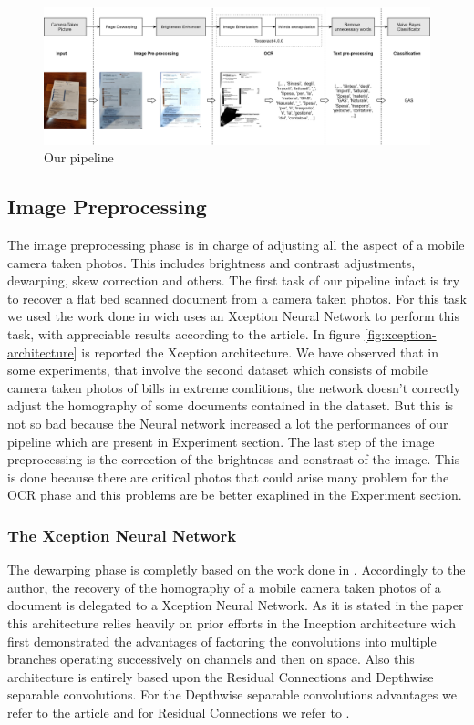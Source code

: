 \documentclass[10pt,twocolumn,letterpaper]{article}
\begin{document}
\begin{figure}[h]
  \centering
  \includegraphics[width=1.0\textwidth]{images/pipeline.png}
  \caption{Our pipeline}
  \label{fig:pipeline}
\end{figure}

\subsection{Image Preprocessing}

The image preprocessing phase is in charge of adjusting all the aspect
of a mobile camera taken photos. This includes brightness and contrast
adjustments, dewarping, skew correction and others. The first task of
our pipeline infact is try to recover a flat bed scanned document from
a camera taken photos. For this task we used the work done in
\cite{Korber18} wich uses an Xception Neural Network
\cite{Xception} to perform this task, with appreciable results
according to the article. In figure \ref{fig:xception-architecture} is
reported the Xception architecture.
We have observed that in some experiments, that involve the second dataset which consists of mobile camera taken photos of bills in extreme conditions,
the network doesn't correctly adjust the homography of some documents
contained in the dataset. But this is not so bad because the Neural network increased a lot the performances of our pipeline which are present in Experiment section. The last step of the image preprocessing is
the correction of the brightness and constrast of the image. This is
done because there are critical photos that could arise many problem
for the OCR phase and this problems are be better exaplined in the
Experiment section.

\subsubsection{The Xception Neural Network}

The dewarping phase is completly based on the work done in
\cite{Korber18}. Accordingly to the author, the recovery of the
homography of a mobile camera taken photos of a document is delegated
to a Xception Neural Network. As it is stated in the paper \cite{Xception}
this architecture relies heavily on prior efforts in the Inception
architecture wich first demonstrated the advantages of factoring the
convolutions into multiple branches operating successively on channels
and then on space. Also this architecture is entirely based upon the Residual Connections and Depthwise separable convolutions. For the Depthwise separable
convolutions advantages we refer to the article \cite{Wang18}
and for Residual Connections we refer to \cite{Sahoo17}.
\end{document}
